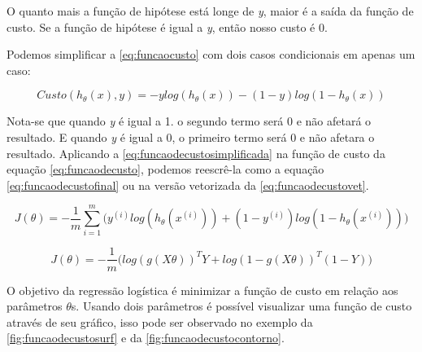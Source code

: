 O quanto mais a função de hipótese está longe de \textit{y}, maior é a saída da função de custo. Se a função de hipótese é igual a \textit{y}, então nosso custo é 0.

Podemos simplificar a \autoref{eq:funcaocusto} com dois casos condicionais em apenas um caso:

\begin{equation} 
\label{eq:funcaodecustosimplificada}
Custo(h_{\theta}(x), y) = -ylog(h_{\theta}(x)) - (1-y)log(1 - h_{\theta}(x))
\end{equation}

Nota-se que quando \textit{y} é igual a 1. o segundo termo será 0 e não afetará o resultado. E quando \textit{y} é igual a 0, o primeiro termo será 0 e não afetara o resultado. Aplicando a \autoref{eq:funcaodecustosimplificada} na função de custo da equação \autoref{eq:funcaodecusto}, podemos reescrê-la como a equação \autoref{eq:funcaodecustofinal} ou na versão vetorizada da \autoref{eq:funcaodecustovet}.

\begin{equation}
\label{eq:funcaodecustofinal}
J(\theta) = - \frac{1}{m}\sum\limits_{i=1}^{m}\Big( y^{(i)}log(h_{\theta}(x^{(i)})) + (1-y^{(i)})log(1 - h_{\theta}(x^{(i)})) \Big)
\end{equation}

\begin{equation}
J(\theta) = - \frac{1}{m}\Big( log(g(X\theta))^TY + log(1 - g(X\theta))^T(1 - Y) \Big) \label{eq:funcaodecustovet}
\end{equation}

O objetivo da regressão logística é minimizar a função de custo em relação aos parâmetros $\theta$s. Usando dois parâmetros é possível visualizar uma função de custo através de seu gráfico, isso pode ser observado no exemplo da \autoref{fig:funcaodecustosurf} e da \autoref{fig:funcaodecustocontorno}. 


